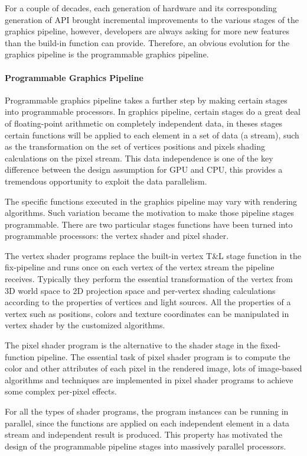 For a couple of decades, each generation of hardware and its corresponding generation of API brought incremental improvements to the various stages of the graphics pipeline, however, developers are always asking for more new features than the build-in function can provide. Therefore, an obvious evolution for the graphics pipeline is the programmable graphics pipeline.   

\paragraph{Programmable Graphics Pipeline}
Programmable graphics pipeline takes a further step by making certain stages into programmable processors. In graphics pipeline, certain stages do a great deal of floating-point arithmetic on completely independent data, in theses stages certain functions will be applied to each element in a set of data (a stream), such as the transformation on the set of vertices positions and pixels shading calculations on the pixel stream. This data independence is one of the key difference between the design assumption for GPU and CPU, this provides a tremendous opportunity to exploit the data parallelism. 

The specific functions executed in the graphics pipeline may vary with rendering algorithms. Such variation became the motivation to make those pipeline stages programmable. There are two particular stages functions have been turned into programmable processors: the vertex shader and pixel shader. 

The vertex shader programs replace the built-in vertex T\&L stage function in the fix-pipeline and runs once on each vertex of the vertex stream the pipeline receives. Typically they perform the essential transformation of the vertex from 3D world space to 2D projection space and per-vertex shading calculations  according to the properties of vertices and light sources. All the properties of a vertex such as positions, colors and texture coordinates can be manipulated in vertex shader by the customized algorithms.   

The pixel shader program is the alternative to the shader stage in the fixed-function pipeline. The essential task of pixel shader program is to compute the color and other attributes of each pixel in the rendered image, lots of image-based algorithms and techniques are implemented in pixel shader programs to achieve some complex per-pixel effects. 

For all the types of shader programs, the program instances can be running in parallel, since the functions are applied on each independent element in a data stream and independent result is produced. This property has motivated the design of the programmable pipeline stages into massively parallel processors.   

